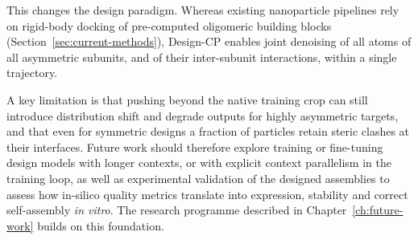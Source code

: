 This changes the design paradigm. Whereas existing nanoparticle pipelines rely on
rigid-body docking of pre-computed oligomeric building blocks
(Section~\ref{sec:current-methods}), Design-CP enables joint denoising of all
atoms of all asymmetric subunits, and of their inter-subunit interactions, within
a single trajectory.

A key limitation is that pushing beyond the native training crop can still
introduce distribution shift and degrade outputs for highly asymmetric targets,
and that even for symmetric designs a fraction of particles retain steric clashes
at their interfaces. Future work should therefore explore training or fine-tuning
design models with longer contexts, or with explicit context parallelism in the
training loop, as well as experimental validation of the designed assemblies to
assess how in-silico quality metrics translate into expression, stability and
correct self-assembly \emph{in vitro}. The research programme described in
Chapter~\ref{ch:future-work} builds on this foundation.
